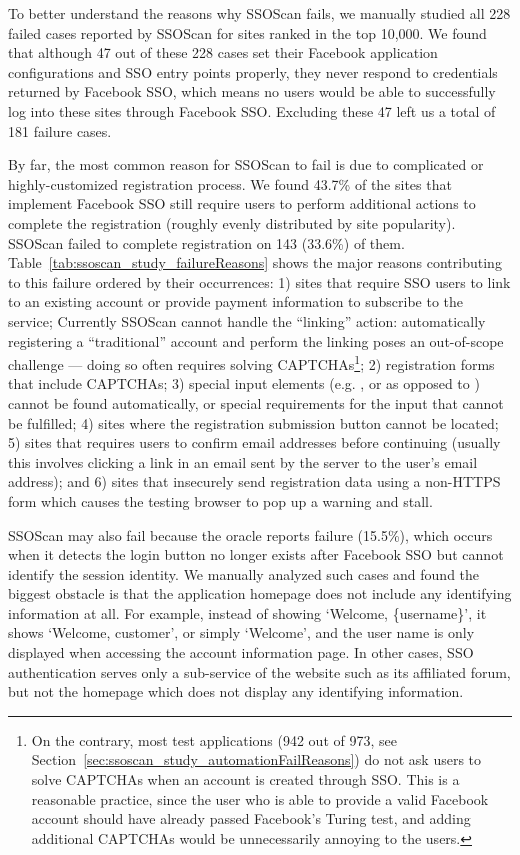 To better understand the reasons why SSOScan fails, we manually studied all 228 failed cases reported by SSOScan for sites ranked in the top 10,000.  We found that although 47 out of these 228 cases set their Facebook application configurations and SSO entry points properly, they never respond to credentials returned by Facebook SSO, which means no users would be able to successfully log into these sites through Facebook SSO.  Excluding these 47 left us a total of 181 failure cases.

 By far, the most common reason for SSOScan to fail is due to complicated or highly-customized registration process.  We found 43.7\% of the sites that implement Facebook SSO still require users to perform additional actions to complete the registration (roughly evenly distributed by site popularity).  SSOScan failed to complete registration on 143 (33.6\%) of them.  Table~\ref{tab:ssoscan_study_failureReasons} shows the major reasons contributing to this failure ordered by their occurrences: 1) sites that require SSO users to link to an existing account or provide payment information to subscribe to the service; Currently SSOScan cannot handle the ``linking'' action: automatically registering a ``traditional'' account and perform the linking poses an out-of-scope challenge --- doing so often requires solving CAPTCHAs\footnote{On the contrary, most test applications (942 out of 973, see Section~\ref{sec:ssoscan_study_automationFailReasons}) do not ask users to solve CAPTCHAs when an account is created through SSO.  This is a reasonable practice, since the user who is able to provide a valid Facebook account should have already passed Facebook's Turing test, and adding additional CAPTCHAs would be unnecessarily annoying to the users.}; 2) registration forms that include CAPTCHAs; 3) special input elements (e.g. ,  or  as opposed to ) cannot be found automatically, or special requirements for the input that cannot be fulfilled; 4) sites where the registration submission button cannot be located; 5) sites that requires users to confirm email addresses before continuing (usually this involves clicking a link in an email sent by the server to the user's email address); and 6) sites that insecurely send registration data using a non-HTTPS form which causes the testing browser to pop up a warning and stall.



 SSOScan may also fail because the oracle reports failure (15.5\%), which occurs when it detects the login button no longer exists after Facebook SSO but cannot identify the session identity.  We manually analyzed such cases and found the biggest obstacle is that the application homepage does not include any identifying information at all.  For example, instead of showing `Welcome, \{username\}', it shows `Welcome, customer', or simply `Welcome', and the user name is only displayed when accessing the account information page.  In other cases, SSO authentication serves only a sub-service of the website such as its affiliated forum, but not the homepage which does not display any identifying information.

